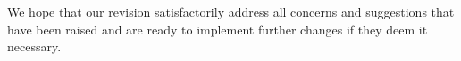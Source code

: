 \documentclass[12pt,english]{article}
\begin{document}
We hope that our revision satisfactorily address all concerns and suggestions that have been raised and are ready to implement further changes if they deem it necessary.












\end{document}
